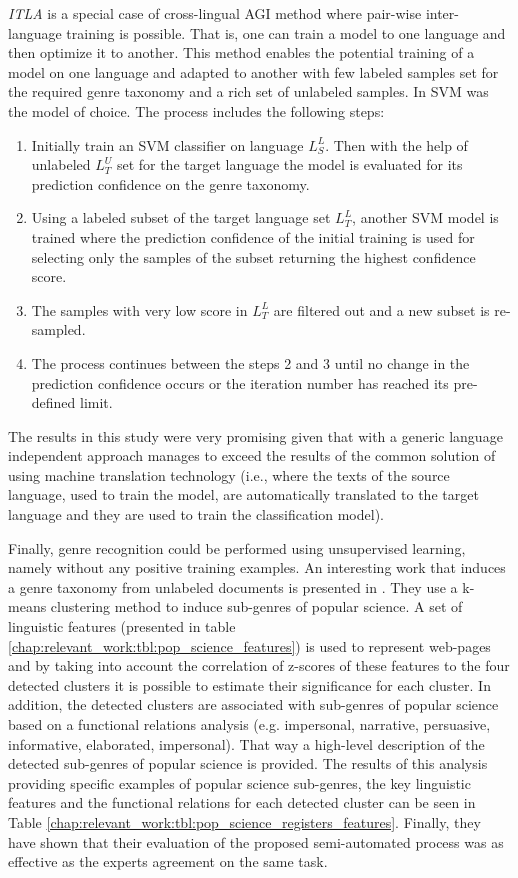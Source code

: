 \textit{ITLA} is a special case of cross-lingual AGI method where pair-wise inter-language training is possible. That is, one can train a model to one language and then optimize it to another. This method enables the potential training of a model on one language and adapted to another with few labeled samples set for the required genre taxonomy and a rich set of unlabeled samples. In \parencite{petrenz2011stable} SVM was the model of choice. The process includes the following steps:

\begin{enumerate}
\item Initially train an SVM classifier on language $L^{L}_{S}$. Then with the help of unlabeled $L^{U}_{T}$ set for the target language the model is evaluated for its prediction confidence on the genre taxonomy.
\item Using a labeled subset of the target language set $L^{L}_{T}$, another SVM model is trained where the prediction confidence of the initial training is used for selecting only the samples of the subset returning the highest confidence score. 
\item The samples with very low score in $L^{L}_{T}$ are filtered out and a new subset is re-sampled.
\item The process continues between the steps 2 and 3 until no change in the prediction confidence occurs or the iteration number has reached its pre-defined limit.
\end{enumerate}

The results in this study were very promising given that with a generic language independent approach manages to exceed the results of the common solution of using machine translation technology (i.e., where the texts of the  source language, used to train the model, are automatically translated to the target language and they are used to train the classification model).

Finally, genre recognition could be performed using unsupervised learning, namely without any positive training examples. An interesting work that induces a genre taxonomy from unlabeled documents is presented in \parencite{lieungnapar2017genre}. They use a k-means clustering method to induce sub-genres of popular science. A set of linguistic features (presented in table \ref{chap:relevant_work:tbl:pop_science_features}) is used to represent web-pages and by taking into account the correlation of z-scores of these features to the four detected clusters it is possible to estimate their significance for each cluster. In addition, the detected clusters are associated with sub-genres of popular science based on a functional relations analysis (e.g. impersonal, narrative, persuasive, informative, elaborated, impersonal). That way a high-level description of the detected sub-genres of popular science is provided. The results of this analysis providing specific examples of popular science sub-genres, the key linguistic features and the functional relations for each detected cluster can be seen in Table \ref{chap:relevant_work:tbl:pop_science_registers_features}. Finally, they have shown that their evaluation of the proposed semi-automated process was as effective as the experts agreement on the same task. 

